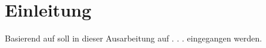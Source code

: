 \section*{Einleitung}

Basierend auf \cite[S.49-55]{humphreys1972introduction} soll in dieser Ausarbeitung auf . . . eingegangen werden. 
